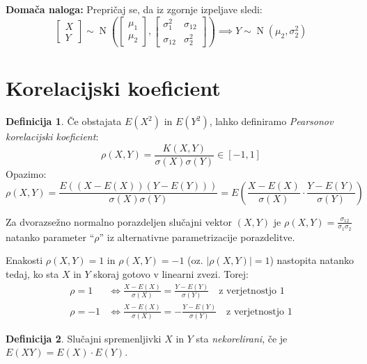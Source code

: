 \documentclass[12pt]{book}
\def\n{\noindent}
\theoremstyle{definition}
\newtheorem{definicija}{Definicija}
\theoremstyle{plain}
\theoremstyle{plain}
\theoremstyle{plain}
\theoremstyle{remark}
\begin{document}
\n \textbf{Domača naloga:} Prepričaj se, da iz zgornje izpeljave sledi:
$$
\begin{bmatrix}
    X \\
    Y
    \end{bmatrix} \sim \operatorname{N}\left(\begin{bmatrix}
    \mu_1 \\
    \mu_2
    \end{bmatrix},\begin{bmatrix}
    \sigma_1^2 & \sigma_{12} \\
    \sigma_{12} & \sigma_2^2
    \end{bmatrix}\right) \implies Y \sim \operatorname{N}\left(\mu_2, \sigma_2^2\right)
$$

\section{Korelacijski koeficient}

\begin{definicija}
    Če obstajata $E\left(X^2\right)$ in $E\left(Y^2\right)$, lahko definiramo \emph{Pearsonov korelacijski koeficient}: 
    $$
    \rho(X, Y)=\frac{K(X, Y)}{\sigma(X) \sigma(Y)} \in [-1, 1]
    $$
    Opazimo: 
    $$
    \rho(X, Y)=\frac{E((X-E(X)) (Y-E(Y)))}{\sigma(X) \sigma(Y)} = E\left(\frac{X-E(X)}{\sigma(X)} \cdot \frac{Y-E(Y)}{\sigma(Y)}\right)
    $$
\end{definicija}

\begin{zgled}
    Za dvorazsežno normalno porazdeljen slučajni vektor $(X,Y)$ je $\rho(X, Y)=\frac{\sigma_{12}}{\sigma_1 \sigma_2}$ natanko parameter “$\rho$” iz alternativne parametrizacije porazdelitve. 
\end{zgled}

\n Enakosti $\rho(X, Y)=1$ in $\rho(X, Y)=-1$ (oz. $|\rho(X, Y)|=1$) nastopita natanko tedaj, ko sta $X$ in $Y$ skoraj gotovo v linearni zvezi. Torej:
$$
\begin{aligned}
    \rho=1 &\iff \frac{X-E(X)}{\sigma(X)}=\frac{Y-E(Y)}{\sigma(Y)} \quad \text {z verjetnostjo 1} \\
    \rho=-1 &\iff \frac{X-E(X)}{\sigma(X)}=-\frac{Y-E(Y)}{\sigma(Y)} \quad \text {z verjetnostjo 1}
\end{aligned}
$$

\begin{definicija}
    Slučajni spremenljivki $X$ in $Y$ sta \emph{nekorelirani}, če je $E(XY) = E(X) \cdot E(Y)$. 
\end{definicija}
\end{document}
